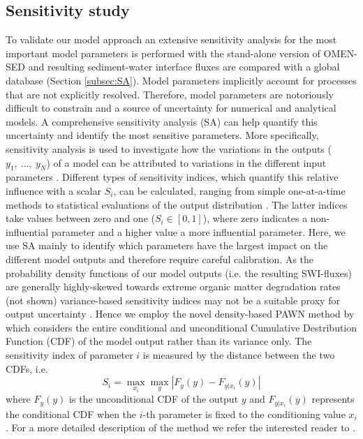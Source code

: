 \documentclass[gmd, manuscript]{copernicus}
\begin{document}
\subsection{Sensitivity study}\label{subsec:methods_SA}
To validate our model approach an extensive sensitivity analysis for the most important model parameters is performed with the stand-alone version of OMEN-SED and resulting sediment-water interface fluxes are compared with a global 
database (Section \ref{subsec:SA}). 
Model parameters implicitly account for processes that are not explicitly resolved. Therefore, model parameters are notoriously difficult to constrain and a source of uncertainty for numerical and analytical models. 
A comprehensive sensitivity analysis (SA) can help quantify this uncertainty and identify the most sensitive parameters. More specifically, sensitivity analysis is used to investigate how the variations in the outputs 
($y_1,\ ...,\ y_N$) of a model can be attributed to variations in the different input parameters \citep[$x_1,\ ...,\ x_M$,][]{pianosi_sensitivity_2016}. Different types of sensitivity indices, which quantify this relative 
influence with a scalar $S_i$, can be calculated, ranging from simple one-at-a-time methods to statistical evaluations of the 
output distribution \citep[e.g. variance-based or density-based approaches][]{pianosi_sensitivity_2016}. The latter indices 
take values between zero and one ($S_i \in [0, 1]$), where zero indicates a non-influential parameter and a higher value a more influential parameter. 
Here, we use SA mainly to identify which parameters have the largest impact on the different model outputs and therefore require careful calibration. 
As the probability density functions of our model outputs (i.e. the resulting SWI-fluxes) are generally highly-skewed towards extreme organic matter degradation rates (not shown) variance-based sensitivity indices 
may not be a suitable proxy for output uncertainty \citep{pianosi_sensitivity_2016}. 
Hence we employ the novel density-based PAWN method by \citet{pianosi_simple_2015} which considers the entire conditional and unconditional Cumulative Destribution Function (CDF) of the model output
rather than its variance only. The sensitivity index of parameter $i$ is measured by the distance between the two CDFs, i.e.
\begin{equation}
 S_i = \max_{x_i} \max_{y} | F_y(y) - F_{y|x_i}(y) |
\end{equation}
where $F_y(y)$ is the unconditional CDF of the output $y$ and $F_{y|x_i}(y)$ represents the conditional CDF when the $i$-th parameter is fixed to the conditioning value $x_i$. 
For a more detailed description of the method we refer the interested reader to \citet{pianosi_simple_2015}. 
\end{document}
